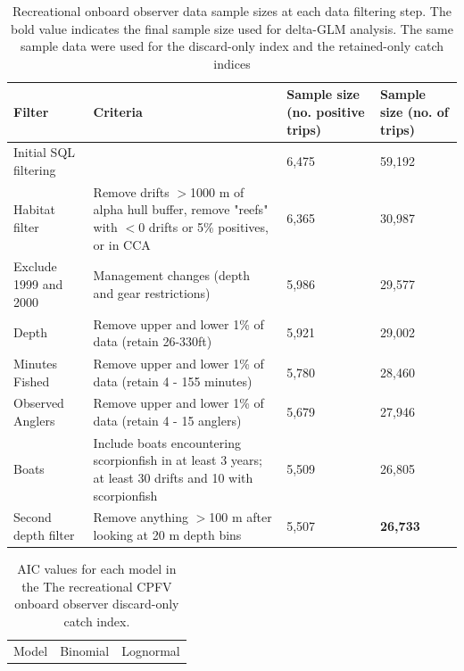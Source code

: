 \documentclass[12pt,]{article}
\begin{document}
\begin{table}[ht]
\centering
\caption{Recreational onboard observer data sample 
                                          sizes at each data filtering step.  
                                          The bold value indicates the final sample size 
                                          used for delta-GLM analysis.
                                          The same sample data were used for the discard-only
                                          index and the retained-only catch indices} 
\label{tab:Fleet6_RecDD_onboard_filter}
\begin{tabular}{>{\raggedright}p{1.5in}>{\raggedright}p{2.6in}>{\raggedright}p{1in}>{\raggedright}p{1in}}
  \hline
Filter & Criteria & Sample size (no. positive trips) & Sample size (no. of trips) \\ 
  \hline
Initial SQL filtering &  & 6,475 & 59,192 \\ 
  Habitat filter & Remove drifts $>$1000 m of alpha hull buffer, remove "reefs" with $<$0 drifts or 5\% positives, or in CCA & 6,365 & 30,987 \\ 
  Exclude 1999 and 2000 & Management changes (depth and gear restrictions) & 5,986 & 29,577 \\ 
  Depth & Remove upper and lower 1\% of data (retain 26-330ft) & 5,921 & 29,002 \\ 
  Minutes Fished & Remove upper and lower 1\% of data (retain 4 - 155 minutes) & 5,780 & 28,460 \\ 
  Observed Anglers & Remove upper and lower 1\% of data (retain 4 - 15 anglers) & 5,679 & 27,946 \\ 
  Boats  & Include boats encountering scorpionfish in at least 3 years; at least 30 drifts and 10 with scorpionfish & 5,509 & 26,805 \\ 
  Second depth filter & Remove anything $>$100 m after looking at 20 m depth bins & 5,507 & \textbf{26,733} \\ 
   \hline
\end{tabular}
\end{table}\begin{table}[ht]
\centering
\caption{AIC values for each model in the
                                          The recreational CPFV onboard 
                                          observer discard-only catch 
                                          index.} 
\label{tab:Fleet6_RecDD_onboard_aic}
\begin{tabular}{lll}
  \hline
Model & Binomial & Lognormal \\ 

\end{tabular}
\end{table}
\end{document}
